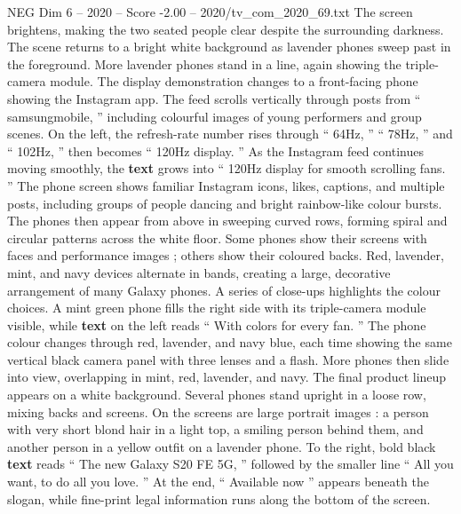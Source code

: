 \begin{textsample}{NEG Dim 6 – 2020 – Score -2.00 – 2020/tv\_com\_2020\_69.txt}
The screen brightens, making the two seated people clear despite the surrounding darkness.
The scene returns to a bright white background as lavender phones sweep past in the foreground.
More lavender phones stand in a line, again showing the triple-camera module.
The display demonstration changes to a front-facing phone showing the Instagram app.
The feed scrolls vertically through posts from “ samsungmobile, ” including colourful images of young performers and group scenes.
On the left, the refresh-rate number rises through “ 64Hz, ” “ 78Hz, ” and “ 102Hz, ” then becomes “ 120Hz display. ” As the Instagram feed continues moving smoothly, the \textbf{text} grows into “ 120Hz display for smooth scrolling fans. ” The phone screen shows familiar Instagram icons, likes, captions, and multiple posts, including groups of people dancing and bright rainbow-like colour bursts.
The phones then appear from above in sweeping curved rows, forming spiral and circular patterns across the white floor.
Some phones show their screens with faces and performance images ; others show their coloured backs.
Red, lavender, mint, and navy devices alternate in bands, creating a large, decorative arrangement of many Galaxy phones.
A series of close-ups highlights the colour choices.
A mint green phone fills the right side with its triple-camera module visible, while \textbf{text} on the left reads “ With colors for every fan. ” The phone colour changes through red, lavender, and navy blue, each time showing the same vertical black camera panel with three lenses and a flash.
More phones then slide into view, overlapping in mint, red, lavender, and navy.
The final product lineup appears on a white background.
Several phones stand upright in a loose row, mixing backs and screens.
On the screens are large portrait images : a person with very short blond hair in a light top, a smiling person behind them, and another person in a yellow outfit on a lavender phone.
To the right, bold black \textbf{text} reads “ The new Galaxy S20 FE 5G, ” followed by the smaller line “ All you want, to do all you love. ” At the end, “ Available now ” appears beneath the slogan, while fine-print legal information runs along the bottom of the screen.

\end{textsample}
